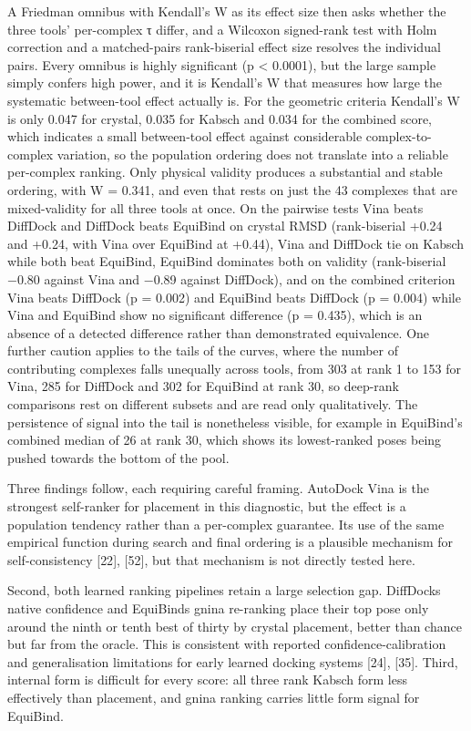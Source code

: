 A Friedman omnibus with Kendall's W as its effect size then asks whether the three tools' per-complex τ differ, and a Wilcoxon signed-rank test with Holm correction and a matched-pairs rank-biserial effect size resolves the individual pairs. Every omnibus is highly significant (p \textless{} 0.0001), but the large sample simply confers high power, and it is Kendall's W that measures how large the systematic between-tool effect actually is. For the geometric criteria Kendall's W is only 0.047 for crystal, 0.035 for Kabsch and 0.034 for the combined score, which indicates a small between-tool effect against considerable complex-to-complex variation, so the population ordering does not translate into a reliable per-complex ranking. Only physical validity produces a substantial and stable ordering, with W = 0.341, and even that rests on just the 43 complexes that are mixed-validity for all three tools at once. On the pairwise tests Vina beats DiffDock and DiffDock beats EquiBind on crystal RMSD (rank-biserial +0.24 and +0.24, with Vina over EquiBind at +0.44), Vina and DiffDock tie on Kabsch while both beat EquiBind, EquiBind dominates both on validity (rank-biserial −0.80 against Vina and −0.89 against DiffDock), and on the combined criterion Vina beats DiffDock (p = 0.002) and EquiBind beats DiffDock (p = 0.004) while Vina and EquiBind show no significant difference (p = 0.435), which is an absence of a detected difference rather than demonstrated equivalence. One further caution applies to the tails of the curves, where the number of contributing complexes falls unequally across tools, from 303 at rank 1 to 153 for Vina, 285 for DiffDock and 302 for EquiBind at rank 30, so deep-rank comparisons rest on different subsets and are read only qualitatively. The persistence of signal into the tail is nonetheless visible, for example in EquiBind's combined median of 26 at rank 30, which shows its lowest-ranked poses being pushed towards the bottom of the pool.

Three findings follow, each requiring careful framing. AutoDock Vina is the strongest self-ranker for placement in this diagnostic, but the effect is a population tendency rather than a per-complex guarantee. Its use of the same empirical function during search and final ordering is a plausible mechanism for self-consistency {[}22{]}, {[}52{]}, but that mechanism is not directly tested here.

Second, both learned ranking pipelines retain a large selection gap. DiffDock\textquotesingle s native confidence and EquiBind\textquotesingle s gnina re-ranking place their top pose only around the ninth or tenth best of thirty by crystal placement, better than chance but far from the oracle. This is consistent with reported confidence-calibration and generalisation limitations for early learned docking systems {[}24{]}, {[}35{]}. Third, internal form is difficult for every score: all three rank Kabsch form less effectively than placement, and gnina ranking carries little form signal for EquiBind.

